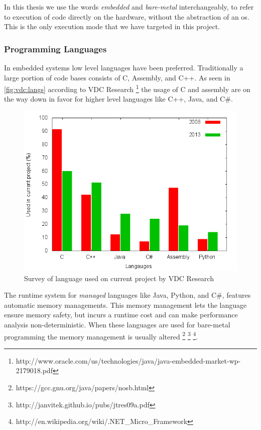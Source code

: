 In this thesis we use the words \emph{embedded} and \emph{bare-metal} interchangeably, to refer to execution of code directly on the hardware, without the abstraction of an \gls{os}.
This is the only execution mode that we have targeted in this project.

\subsubsection{Programming Languages}

In embedded systems low level languages have been preferred.
Traditionally a large portion of code bases consists of C, Assembly, and C++.
As seen in \autoref{fig:vdc:langs} according to VDC Research \footnote{http://www.oracle.com/us/technologies/java/java-embedded-market-wp-2179018.pdf} the usage of C and assembly are on the way down in favor for higher level languages like C++, Java, and C\#.

\begin{figure}[H]
  \begin{center}
    \includegraphics[scale=0.5]{figures/plots/langs.png}
  \end{center}
  \caption{Survey of language used on current project by VDC Research}
  \label{fig:vdc:langs}
\end{figure}

The runtime system for \emph{managed} languages like Java, Python, and C\#, features automatic memory managements.
This memory management lets the language ensure memory safety, but incurs a runtime cost and can make performance analysis non-deterministic.
When these languages are used for bare-metal programming the memory management is usually altered \footnote{https://gcc.gnu.org/java/papers/nosb.html} \footnote{http://janvitek.github.io/pubs/jtres09a.pdf} \footnote{http://en.wikipedia.org/wiki/.NET_Micro_Framework}.

